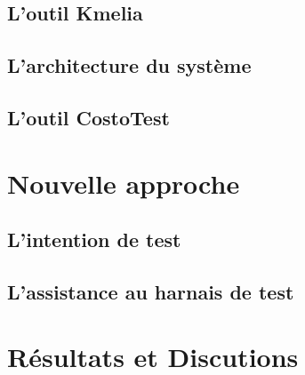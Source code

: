 \documentclass[
10pt, %
a4paper, %
oneside, %
headinclude,footinclude, %
BCOR5mm, %
]{scrartcl}
\begin{document}
\subsection{L'outil Kmelia}

\lipsum[5] %

\subsection{L'architecture du système}

\lipsum[5] %

\subsection{L'outil CostoTest}

\lipsum[5] %


\newpage 
\section{Nouvelle approche}
\lipsum[5] %

\subsection{L'intention de test}
\lipsum[5] %

\subsection{L'assistance au harnais de test}
\lipsum[5] %



\newpage 
\section{Résultats et Discutions}



\lipsum[10] %



\renewcommand{\refname}{\spacedlowsmallcaps{References}} %
\newpage 



\end{document}
